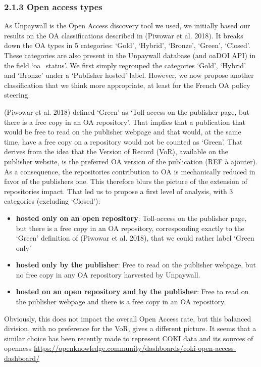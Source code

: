 \documentclass[
]{article}
\begin{document}
\hypertarget{open-access-types}{%
\subsubsection{2.1.3 Open access types}\label{open-access-types}}

As Unpaywall is the Open Access discovery tool we used, we initially
based our results on the OA classifications described in (Piwowar et al.
2018). It breaks down the OA types in 5 categories: `Gold', `Hybrid',
`Bronze', `Green', `Closed'. These categories are also present in the
Unpaywall database (and oaDOI API) in the field `oa\_status'. We first
simply regrouped the categories `Gold', `Hybrid' and `Bronze' under a
`Publisher hosted' label. However, we now propose another classification
that we think more appropriate, at least for the French OA policy
steering.

(Piwowar et al. 2018) defined `Green' as `Toll-access on the publisher
page, but there is a free copy in an OA repository'. That implies that a
publication that would be free to read on the publisher webpage and that
would, at the same time, have a free copy on a repository would not be
counted as `Green'. That derives from the idea that the Version of
Record (VoR), available on the publisher website, is the preferred OA
version of the publication (REF à ajouter). As a consequence, the
repositories contribution to OA is mechanically reduced in favor of the
publishers one. This therefore blurs the picture of the extension of
repositories impact. That led us to propose a first level of analysis,
with 3 categories (excluding `Closed'):

\begin{itemize}
\item
  \textbf{hosted only on an open repository}: Toll-access on the
  publisher page, but there is a free copy in an OA repository,
  corresponding exactly to the `Green' definition of (Piwowar et al.
  2018), that we could rather label `Green only'
\item
  \textbf{hosted only by the publisher}: Free to read on the publisher
  webpage, but no free copy in any OA repository harvested by Unpaywall.
\item
  \textbf{hosted on an open repository and by the publisher}: Free to
  read on the publisher webpage and there is a free copy in an OA
  repository.
\end{itemize}

Obviously, this does not impact the overall Open Access rate, but this
balanced division, with no preference for the VoR, gives a different
picture. It seems that a similar choice has been recently made to
represent COKI data and its sources of openness
\url{https://openknowledge.community/dashboards/coki-open-access-dashboard/}
\end{document}
